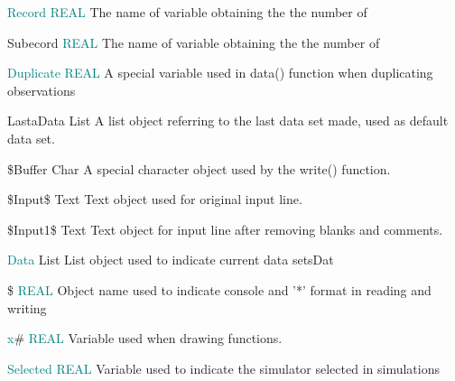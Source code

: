 { 
\noindent \textcolor{teal}{Record} \tabto{25mm }   \textcolor{teal}{REAL}  \tabto{45mm }   The name of variable obtaining the the number of 
 
 
\noindent Subecord \tabto{25mm }   \textcolor{teal}{REAL}  \tabto{45mm }   The name of variable obtaining the the number of 
 
 
\noindent \textcolor{teal}{Duplicate} \tabto{25mm }   \textcolor{teal}{REAL} \tabto{45mm }   A special variable used in \textcolor{VioletRed}{data}() function when duplicating observations 
 
 
\noindent LastaData  \tabto{25mm }  List \tabto{45mm }  	A list object referring to the last data set made, used as default data set. 
 
 
\noindent \$Buffer \tabto{25mm }  Char \tabto{45mm }   A special character object used by the \textcolor{VioletRed}{write}() function. 
 
 
\noindent \$Input\$ \tabto{25mm }   Text  \tabto{45mm }   Text object used for original input line. 
 
\$Input1\$  \tabto{25mm }  Text \tabto{45mm }   Text object for input line after removing blanks and comments. 
 
 
\noindent \textcolor{teal}{Data}  \tabto{25mm }  List \tabto{45mm }    List object used to indicate current data setsDat 
 
 
 
 
 
 
 
 
 
 
 
 
 
 
 
 
 
 
 
 
 
 
 
 
 
 
 
 
 
 
 
 
 
\noindent \$ \tabto{25mm }  \textcolor{teal}{REAL} \tabto{45mm }   Object name used to indicate console and '*' format in reading and writing 
 
 
\noindent \textcolor{teal}{x}\# \tabto{25mm }  \textcolor{teal}{REAL} \tabto{45mm }   Variable used when drawing functions. 
 
\noindent \textcolor{teal}{Selected} \tabto{25mm }   \textcolor{teal}{REAL}  \tabto{45mm }  Variable used to indicate the simulator selected in simulations 
 
}
